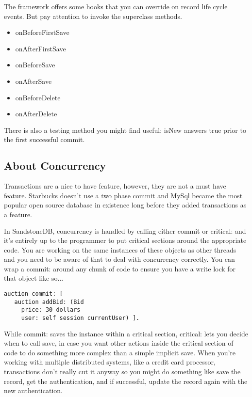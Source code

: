 \documentclass[a4paper,10pt,twoside]{book}
\newcommand{\ct}[1]{{\small\ttfamily\textup{#1}}}
\begin{document}
The framework offers some hooks that you can override on record life
cycle events. But pay attention to invoke the superclass methods.

\begin{itemize}
\item  \ct{onBeforeFirstSave}
\item  \ct{onAfterFirstSave}
\item  \ct{onBeforeSave}
\item  \ct{onAfterSave}
\item  \ct{onBeforeDelete}
\item  \ct{onAfterDelete}
\end{itemize}

There is also a testing method you might find useful: \ct{isNew} answers true prior to the first successful commit.

\subsection{About Concurrency}
\label{book:advanced:persistency:sandstone:concurrency}

Transactions are a nice to have feature, however, they are not a must have feature. Starbucks doesn't use a two phase commit and MySql became the most popular open source database in existence long before they added transactions as a feature.

In SandstoneDB, concurrency is handled by calling either \ct{commit} or \ct{critical:} and it's entirely up to the programmer to put critical sections around the appropriate code. You are working on the same instances of these objects as other threads and you need to be aware of that to deal with concurrency correctly. You can wrap a \ct{commit:} around any chunk of code to ensure you have a write lock for that object like so...

\begin{lstlisting}
auction commit: [ 
   auction addBid: (Bid 
     price: 30 dollars
     user: self session currentUser) ].
\end{lstlisting}

While \ct{commit:} saves the instance within a critical section, \ct{critical:} lets you decide when to call \ct{save}, in case you want other actions inside the critical section of code to do something more complex than a simple implicit save. When you're working with multiple distributed systems, like a credit card processor, transactions don't really cut it anyway so you might do something like save the record, get the authentication, and if successful, update the record again with the new authentication.
\end{document}
